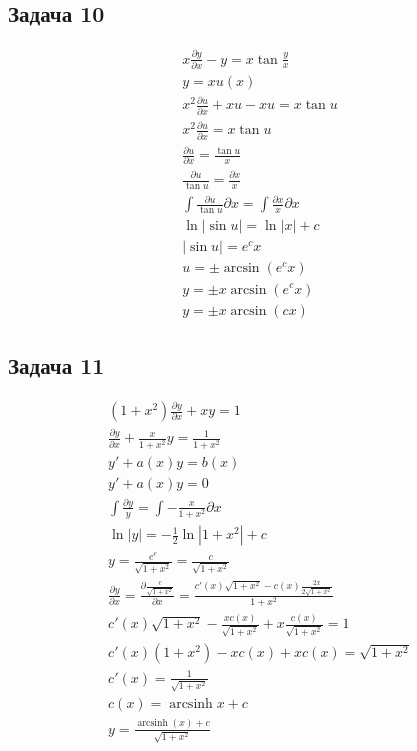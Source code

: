 \subsection*{Задача 10}
\begin{gather*}
	x \frac{\partial y}{\partial x} - y = x \tan \frac{y}{x}\\
	y = xu(x)\\
	x^{2} \frac{\partial u}{\partial x} + xu - xu = x \tan u\\
	x^{2} \frac{\partial u}{\partial x} = x \tan u\\
	\frac{\partial u}{\partial x} = \frac{\tan u}{x}\\
	\frac{\partial u}{\tan u} = \frac{\partial x}{x}\\
	\int \frac{\partial u}{\tan u} \partial x = \int \frac{\partial x}{x} \partial x\\
	\ln|\sin u| = \ln|x| + c\\
	|\sin u| = e^{c} x\\
	u = \pm \arcsin(e^{c} x)\\
	y = \pm x \arcsin(e^{c} x)\\
	y = \pm x \arcsin(c x)
\end{gather*}

\subsection*{Задача 11}
\begin{gather*}
	(1+x^2) \frac{\partial y}{\partial x} + xy = 1\\
	\frac{\partial y}{\partial x} + \frac{x}{1+x^2}y = \frac{1}{1+x^2}\\
	y' + a(x)y = b(x)\\
	y' + a(x)y = 0\\
	\int \frac{\partial y}{y} = \int - \frac{x}{1+x^2} \partial x\\
	\ln |y| = -\frac{1}{2} \ln|1+x^2| + c\\
	y = \frac{e^c}{\sqrt{1+x^2}} = \frac{c}{\sqrt{1+x^2}}\\
	\frac{\partial y}{\partial x} = \frac{\partial \frac{c}{\sqrt{1+x^2}}}{\partial x} = \frac{c'(x) \sqrt{1 + x^2} - c(x) \frac{2x}{2\sqrt{1+x^2}}}{1+x^2}\\
	c'(x) \sqrt{1+x^2} - \frac{xc(x)}{\sqrt{1+x^2}} + x \frac{c(x)}{\sqrt{1+x^2}} = 1\\
	c'(x) (1+x^2) - xc(x) + xc(x) = \sqrt{1+x^2}\\
	c'(x) = \frac{1}{\sqrt{1+x^2}}\\
	c(x) = \operatorname{arcsinh} x + c\\
	y = \frac{\operatorname{arcsinh}(x) + c}{\sqrt{1+x^2}}
\end{gather*}

